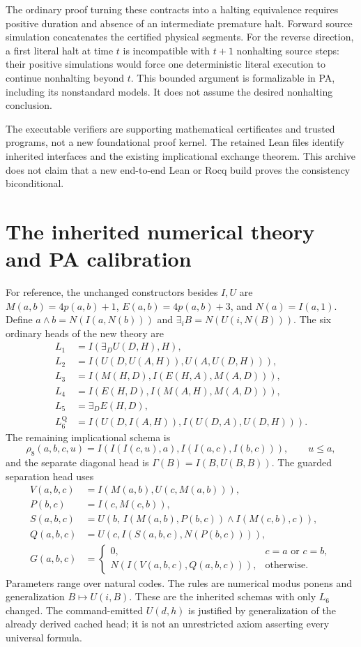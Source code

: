 \documentclass[11pt,letterpaper]{article}
\begin{document}
The ordinary proof turning these contracts into a halting equivalence
requires positive duration and absence of an intermediate premature halt.
Forward source simulation concatenates the certified physical segments.
For the reverse direction, a first literal halt at time $t$ is incompatible
with $t+1$ nonhalting source steps: their positive simulations would force
one deterministic literal execution to continue nonhalting beyond $t$.
This bounded argument is formalizable in PA, including its nonstandard
models. It does not assume the desired nonhalting conclusion.

The executable verifiers are supporting mathematical certificates and
trusted programs, not a new foundational proof kernel. The retained Lean
files identify inherited interfaces and the existing implicational
exchange theorem. This archive does not claim that a new end-to-end Lean
or Rocq build proves the consistency biconditional.



\section{The inherited numerical theory and PA calibration}

For reference, the unchanged constructors besides $I,U$ are
$M(a,b)=4p(a,b)+1$, $E(a,b)=4p(a,b)+3$, and $N(a)=I(a,1)$.
Define $a\wedge b=N(I(a,N(b)))$ and
$\exists_i B=N(U(i,N(B)))$. The six ordinary heads of the new theory are
\[
\begin{aligned}
 L_1&=I(\exists_D U(D,H),H),\\
 L_2&=I(U(D,U(A,H)),U(A,U(D,H))),\\
 L_3&=I(M(H,D),I(E(H,A),M(A,D))),\\
 L_4&=I(E(H,D),I(M(A,H),M(A,D))),\\
 L_5&=\exists_D E(H,D),\\
 L_6^{\mathrm Q}&=I(U(D,I(A,H)),I(U(D,A),U(D,H))).
\end{aligned}
\]
The remaining implicational schema is
\[
 \rho_8(a,b,c,u)=I(I(I(c,u),a),I(I(a,c),I(b,c))),\qquad u\le a,
\]
and the separate diagonal head is $\Gamma(B)=I(B,U(B,B))$.
The guarded separation head uses
\[
\begin{aligned}
 V(a,b,c)&=I(M(a,b),U(c,M(a,b))),\\
 P(b,c)&=I(c,M(c,b)),\\
 S(a,b,c)&=U(b,\,I(M(a,b),P(b,c))\wedge I(M(c,b),c)),\\
 Q(a,b,c)&=U(c,I(S(a,b,c),N(P(b,c)))),\\
 G(a,b,c)&=\begin{cases}0,&c=a\text{ or }c=b,\\
                       N(I(V(a,b,c),Q(a,b,c))),&\text{otherwise}.
          \end{cases}
\end{aligned}
\]
Parameters range over natural codes. The rules are numerical modus ponens
and generalization $B\mapsto U(i,B)$. These are the inherited schemas with
only $L_6$ changed. The command-emitted $U(d,h)$ is justified by
generalization of the already derived cached head; it is not an
unrestricted axiom asserting every universal formula.
\end{document}
